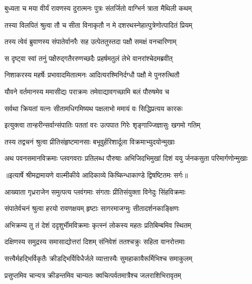 \twolineshloka
{बुध्यता च मया वीर्यं रावणस्य दुरात्मनः}
{पुत्रः संतर्जितो वाग्भिर्न त्राता मैथिली कथम्} %

\twolineshloka
{तस्या विलपितं श्रुत्वा तौ च सीता विनाकृतौ}
{न मे दशरथस्नेहात्पुत्रेणोत्पादितं प्रियम्} %

\twolineshloka
{तस्य त्वेवं ब्रुवाणस्य संपातेर्वानरैः सह}
{उत्पेततुस्तदा पक्षौ समक्षं वनचारिणाम्} %

\twolineshloka
{स दृष्ट्वा स्वां तनुं पक्षैरुद्गतैररुणच्छदैः}
{प्रहर्षमतुलं लेभे वानरांश्चेदमब्रवीत्} %

\twolineshloka
{निशाकरस्य महर्षेः प्रभावादमितात्मनः}
{आदित्यरश्मिनिर्दग्धौ पक्षौ मे पुनरुत्थितौ} %

\twolineshloka
{यौवने वर्तमानस्य ममासीद्यः पराक्रमः}
{तमेवाद्यावगच्छामि बलं पौरुषमेव च} %

\twolineshloka
{सर्वथा क्रियतां यत्नः सीतामधिगमिष्यथ}
{पक्षलाभो ममायं वः सिद्धिप्रत्यय कारकः} %

\twolineshloka
{इत्युक्त्वा तान्हरीन्सर्वान्संपातिः पततां वरः}
{उत्पपात गिरेः शृङ्गाज्जिज्ञासुः खगमो गतिम्} %

\twolineshloka
{तस्य तद्वचनं श्रुत्वा प्रीतिसंहृष्टमानसाः}
{बभूवुर्हरिशार्दूला विक्रमाभ्युदयोन्मुखाः} %

\fourlineindentedshloka
{अथ पवनसमानविक्रमाः}
{ प्लवगवराः प्रतिलब्ध पौरुषाः}
{अभिजिदभिमुखां दिशं ययु}
{र्जनकसुता परिमार्गणोन्मुखाः} %


{॥इत्यार्षे श्रीमद्रामायणे वाल्मीकीये आदिकाव्ये किष्किन्धाकाण्डे द्विषष्टितमः सर्गः॥}


\twolineshloka
{आख्याता गृध्रराजेन समुत्पत्य प्लवंगमाः}
{संगताः प्रीतिसंयुक्ता विनेदुः सिंहविक्रमाः} %

\twolineshloka
{संपातेर्वचनं श्रुत्वा हरयो रावणक्षयम्}
{हृष्टाः सागरमाजग्मुः सीतादर्शनकाङ्क्षिणः} %

\twolineshloka
{अभिक्रम्य तु तं देशं ददृशुर्भीमविक्रमाः}
{कृत्स्नं लोकस्य महतः प्रतिबिम्बमिव स्थितम्} %

\twolineshloka
{दक्षिणस्य समुद्रस्य समासाद्योत्तरां दिशम्}
{संनिवेशं ततश्चक्रुः सहिता वानरोत्तमाः} %

\twolineshloka
{सत्त्वैर्महद्भिर्विकृतैः क्रीडद्भिर्विविधैर्जले}
{व्यात्तास्यैः सुमहाकायैरूर्मिभिश्च समाकुलम्} %

\twolineshloka
{प्रसुप्तमिव चान्यत्र क्रीडन्तमिव चान्यतः}
{क्वचित्पर्वतमात्रैश्च जलराशिभिरावृतम्} %

